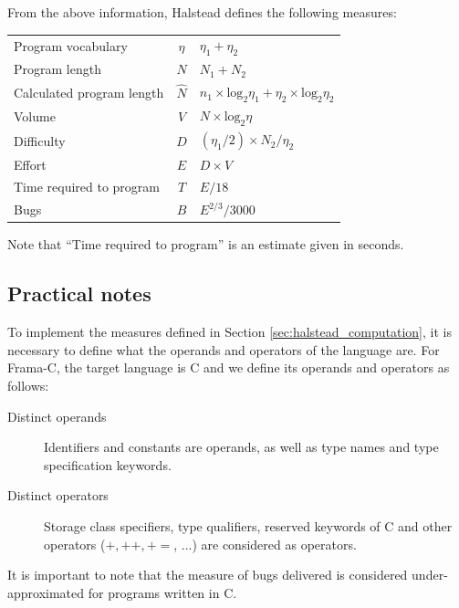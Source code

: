 \documentclass{frama-c-book}
\begin{document}
From the above information, Halstead defines the following measures:
\begin{center}
  \begin{tabular}{lcl}
    Program vocabulary        &  $\eta$     & $\eta_{1} + \eta_{2}$ \\
    Program length            &  $N$       & $N_{1} + N_{2}$ \\
    Calculated program length &  $\hat{N}$
                              &  $n_{1} \times \text{log}_{2} \eta_{1} +
                                \eta_{2} \times \text{log}_{2}\eta_{2}$
                              \\
    Volume                    &  $V$        & $N \times \text{log}_{2} \eta$ \\
    Difficulty                &  $D$        & $(\eta_{1} / 2) \times N_{2} / \eta_{2}$ \\
    Effort                    &  $E$        & $D \times V $ \\
    Time required to program  &  $T$        & $E / 18$ \\
    Bugs                      &  $B$        & $E^{2/3} / 3000$ \\
  \end{tabular}
\end{center}

Note that ``Time required to program'' is an estimate given in seconds.

\subsection{Practical notes}
\label{sec:plug-functionalities}

To implement the measures defined in Section \ref{sec:halstead_computation}, it
is necessary to define what the operands and operators of the language are. For
Frama-C, the target language is C and we define its operands and operators as
follows:
\begin{description}
\item[Distinct operands] Identifiers and constants are operands, as well as type
  names and type specification keywords.
\item[Distinct operators] Storage class specifiers, type qualifiers, reserved
  keywords of C and other operators ($+, ++, +=$, ...) are considered as operators.
\end{description}

It is important to note that the measure of bugs delivered is considered
under-approximated for programs written in C.
\end{document}
